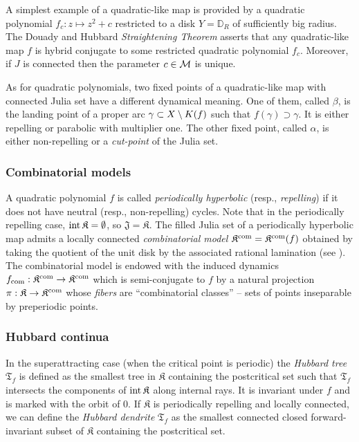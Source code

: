 \documentclass{amsart}
\newcommand{\Disk}{\mathbb{D}}
\newcommand{\filled}{{\mathfrak K }}
\newcommand{\Julia}{{\mathfrak J }}
\newcommand{\Post}{{\mathfrak P }}
\newcommand{\Hub}{{\mathfrak T}}
\newcommand{\1}{{\mathbb 1 }}
\begin{document}
A simplest example of a quadratic-like map is provided by a quadratic polynomial $f_c: z\mapsto z^2+c$
restricted to a disk $Y=\Disk_R$ of sufficiently big radius. The  Douady and Hubbard {\it Straightening Theorem} asserts that 
any quadratic-like map $f$ is hybrid conjugate %
to some restricted quadratic polynomial $f_c$. 
Moreover, if $J$ is connected then the parameter $c\in {\mathcal M}$ is unique.

As for quadratic polynomials, two fixed points of a quadratic-like map with connected Julia set
have a different dynamical meaning. One of them, called $\beta$, is 
 the landing point of a proper arc $\gamma\subset X \setminus K(f) $  such that $f(\gamma)\supset \gamma$.
It is either repelling or parabolic with multiplier one. The other fixed point, called  $\alpha$, is either 
non-repelling or a {\it  cut-point}  of the Julia set.



\subsubsection{Combinatorial models}
A quadratic polynomial $f$ is called {\em periodically  hyperbolic}  (resp., {\em repelling}) if it does not have neutral
(resp., non-repelling) cycles. Note that in the periodically repelling case, $\inter \filled=\emptyset$, so $\Julia=\filled$. 
The filled Julia set of a periodically hyperbolic map admits a locally connected {\em combinatorial model}
$\filled^\com= \filled^\com (f)$ obtained by taking the quotient of the unit disk by the associated
rational lamination (see \cite[\S 32.1.3]{L:book}). The combinatorial model is endowed with the induced dynamics $f_\com: \filled^\com\ra \filled^\com$ which is semi-conjugate to $f$ by a natural  projection $\pi: \filled\ra \filled^\com$ whose {\em fibers} are ``combinatorial classes'' -- sets of points inseparable by preperiodic points.


 \subsubsection{Hubbard continua}\label{sss:CombHT}
In the superattracting case (when the critical point is periodic) the {\em Hubbard tree} $\Hub_f$
is defined as the smallest tree in $\filled$ containing the postcritical set such that $\Hub_f$ intersects the components
of $\inter \filled$ along internal rays. It is invariant under $f$ and is marked with the orbit of $0$. If $\filled$ is periodically repelling and locally connected, we can define the
{\em Hubbard dendrite}  $\Hub_f$ as the smallest connected closed forward-invariant subset of $\filled$ containing the postcritical set.
\end{document}
